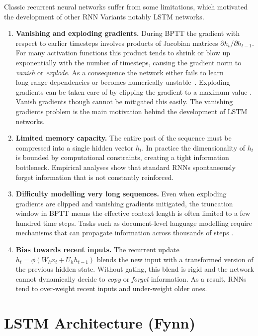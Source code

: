 \documentclass[twoside,a4paper,10pt,DIV=12,BCOR=12mm]{scrartcl}
\begin{document}
Classic recurrent neural networks suffer from some limitations, which motivated the development 
of other RNN Variants notably LSTM networks.

\begin{enumerate}[label=(\roman*)]
\item \textbf{Vanishing and exploding gradients.}  During BPTT the gradient with respect to earlier timesteps involves products of Jacobian
  matrices $\partial h_t/\partial h_{t-1}$.  For many activation functions this product tends to shrink or blow up exponentially with
  the number of timesteps, causing the gradient norm to \emph{vanish} or \emph{explode}.
  As a consequence the network either fails to learn long‑range dependencies or becomes numerically unstable~\cite{hochreiter1997lstm,pascanu2013rnntraining}.
  Exploding gradients can be taken care of by clipping the gradient to a maximum value \cite{pascanu2013rnntraining}.
  Vanish gradients though cannot be mitigated this easily. The vanishing gradients problem is the main motivation behind the
  development of LSTM networks.
\item \textbf{Limited memory capacity.}  The entire past of the sequence must be compressed into a single hidden vector $h_t$.
  In practice the dimensionality of $h_t$ is bounded by computational constraints, creating a tight information bottleneck.
  Empirical analyses show that standard RNNs spontaneously forget information that is not constantly reinforced.
\item \textbf{Difficulty modelling very long sequences.}  Even when exploding gradients are clipped and vanishing 
  gradients mitigated, the truncation window in BPTT means the effective context length is often limited to a few hundred
  time steps.  Tasks such as document‑level language modelling require mechanisms that can propagate information across thousands of steps \cite{pascanu2013rnntraining}.
\item \textbf{Bias towards recent inputs.}  The recurrent update $h_t=\phi(W_h x_t + U_h h_{t-1})$ blends the new input with a 
  transformed version of the previous hidden state.  Without gating, this blend is rigid and the network cannot dynamically decide 
  to \emph{copy} or \emph{forget} information.  As a result, RNNs tend to over‑weight recent inputs and under‑weight older ones.
\end{enumerate}

\section{LSTM Architecture (Fynn)}
\end{document}
